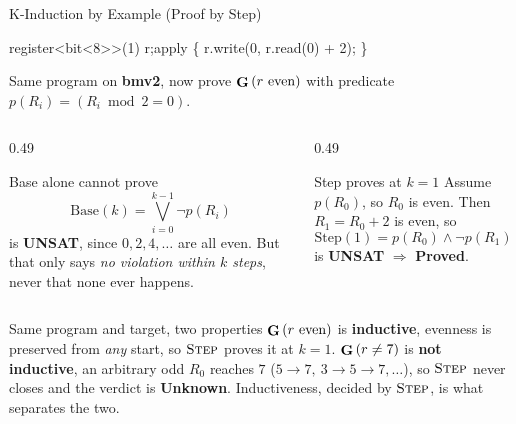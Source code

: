 \begin{frame}{K-Induction by Example (Proof by Step)}
  \centering
  \small
  \begin{minipage}{0.96\textwidth}\centering
    \ttfamily\footnotesize
    register<bit<8>{}>(1) r;\qquad apply \{ r.write(0, r.read(0) + 2); \}
  \end{minipage}
  \par\vspace{0.3em}
  Same program on \textbf{\textcolor{palCerulean!60!black}{bmv2}}, now prove
  \(\mathop{\mathbf{G}}\,(r\ \text{even})\) with predicate \(p(R_i) = (R_i \bmod 2 = 0)\).

  \vspace{0.7em}
  \begin{columns}[T,onlytextwidth]
    \begin{column}{0.49\textwidth}
      \begin{block}{Base alone cannot prove}
        \small
        \[ \mathrm{Base}(k) = \bigvee_{i=0}^{k-1}\lnot p(R_i) \]
        is \textcolor{palOlivine!60!black}{\textbf{UNSAT}}, since
        \(0, 2, 4, \dots\) are all even. But that only says \emph{no violation
        within \(k\) steps}, never that none ever happens.
      \end{block}
    \end{column}

    \begin{column}{0.49\textwidth}
      \begin{block}{Step proves at \(k = 1\)}
        \small
        Assume \(p(R_0)\), so \(R_0\) is even. Then \(R_1 = R_0 + 2\) is even, so
        \[ \mathrm{Step}(1) = p(R_0) \wedge \lnot p(R_1) \]
        is \textcolor{palOlivine!60!black}{\textbf{UNSAT}} \(\Rightarrow\)
        \textbf{Proved}.
      \end{block}
    \end{column}
  \end{columns}

  \vspace{0.5em}
  \begin{block}{Same program and target, two properties}
    \footnotesize
    \(\mathop{\mathbf{G}}\,(r\ \text{even})\) is \textbf{inductive}, evenness is preserved
    from \emph{any} start, so \(\textsc{Step}\) proves it at \(k = 1\).
    \(\mathop{\mathbf{G}}\,(r \neq 7)\) is \textbf{not inductive}, an arbitrary odd
    \(R_0\) reaches \(7\) (\(5{\to}7,\ 3{\to}5{\to}7,\dots\)), so \(\textsc{Step}\)
    never closes and the verdict is \textbf{Unknown}. Inductiveness, decided by
    \(\textsc{Step}\), is what separates the two.
  \end{block}
\end{frame}


